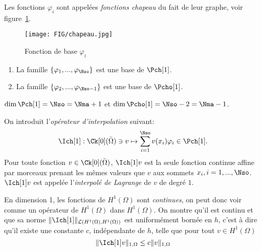 Les fonctions $\varphi_i$ sont appelées \emph{fonctions chapeau} du fait de
leur graphe, voir figure~\ref{fig:chapeau}.
%
\begin{figure}[h]
\begin{center}
\texttt{[image: FIG/chapeau.jpg]}
\caption{Fonction de base $\varphi_i$}
\label{fig:chapeau}
\end{center}
\end{figure}


\begin{proposition}
  \label{prop:4}
  \begin{enumerate}
  \item   La famille $\{\varphi_1,...,\varphi_\Nso\}$ est une base de $\Pch[1]$.
  \item   La famille $\{\varphi_2,...,\varphi_{\Nso-1}\}$ est une base de $\Pcho[1]$.
  \end{enumerate}
\end{proposition}
\begin{corollary}
  $\dim \Pch[1] = \Nso = \Nma+1$ et $\dim \Pcho[1] = \Nso-2 = \Nma-1$.
\end{corollary}

On introduit l'\emph{opérateur d'interpolation} suivant:
\begin{equation}
  \label{eq:21}
  \Ich[1] : \Ck[0](\bar{\Omega}) \ni v \mapsto \sum_{i=1}^\Nso v(x_i)
  \varphi_i \in \Pch[1].
\end{equation}
Pour toute fonction $v \in \Ck[0](\bar{\Omega})$, $\Ich[1] v$ est la seule
fonction continue affine par morceaux prenant les mêmes valeurs que $v$ aux
sommets $x_i, i=1,...,\Nso$.  $\Ich[1] v$ est appelée l'\emph{interpolé de
Lagrange} de $v$ de degré $1$.

\begin{remark}
  \label{rem:8}
  En dimension 1, les fonctions de $H^1(\Omega)$ sont \emph{continues}, on
  peut donc voir \Ich[1] comme un opérateur de $H^1(\Omega)$ dans
  $H^1(\Omega)$. On montre qu'il est continu et que sa norme
  $\|\Ich[1]\|_{\mathcal{L}(H^1(\Omega),H^1(\Omega))}$ est uniformément bornée en
  $h$, c'est à dire qu'il existe une constante $c$, indépendante de $h$, telle
  que pour tout $v \in H^1(\Omega)$
  \begin{equation}
    \label{eq:22}
    \|\Ich[1] v \|_{1,\Omega} \leq c \|v\|_{1,\Omega}
  \end{equation}
\end{remark}

